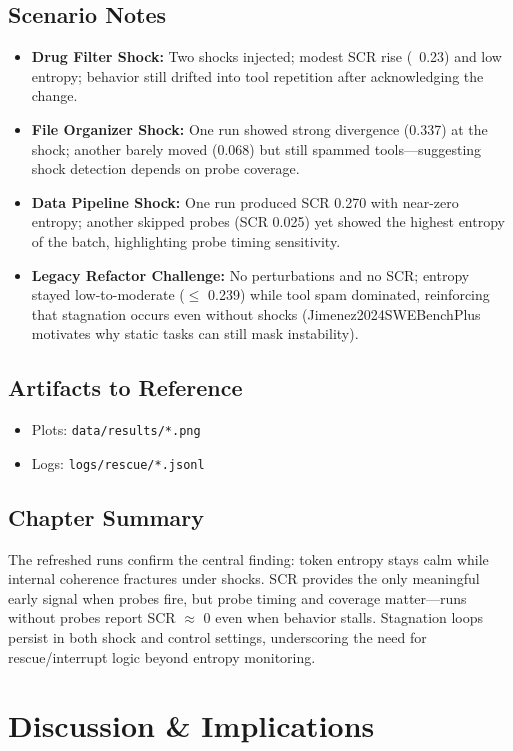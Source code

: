 \documentclass[12pt,a4paper]{report}
\begin{document}
\section{Scenario Notes}
\begin{itemize}
    \item \textbf{Drug Filter Shock:} Two shocks injected; modest SCR rise (~0.23) and low entropy; behavior still drifted into tool repetition after acknowledging the change.
    \item \textbf{File Organizer Shock:} One run showed strong divergence (0.337) at the shock; another barely moved (0.068) but still spammed tools—suggesting shock detection depends on probe coverage.
    \item \textbf{Data Pipeline Shock:} One run produced SCR 0.270 with near-zero entropy; another skipped probes (SCR 0.025) yet showed the highest entropy of the batch, highlighting probe timing sensitivity.
    \item \textbf{Legacy Refactor Challenge:} No perturbations and no SCR; entropy stayed low-to-moderate ($\le$ 0.239) while tool spam dominated, reinforcing that stagnation occurs even without shocks (Jimenez2024SWEBenchPlus motivates why static tasks can still mask instability).
\end{itemize}

\section{Artifacts to Reference}
\begin{itemize}
    \item Plots: \texttt{data/results/*.png}
    \item Logs: \texttt{logs/rescue/*.jsonl}
\end{itemize}

\section{Chapter Summary}
The refreshed runs confirm the central finding: token entropy stays calm while internal coherence fractures under shocks. SCR provides the only meaningful early signal when probes fire, but probe timing and coverage matter—runs without probes report SCR $\approx$ 0 even when behavior stalls. Stagnation loops persist in both shock and control settings, underscoring the need for rescue/interrupt logic beyond entropy monitoring.

\chapter{Discussion \& Implications}
\end{document}
